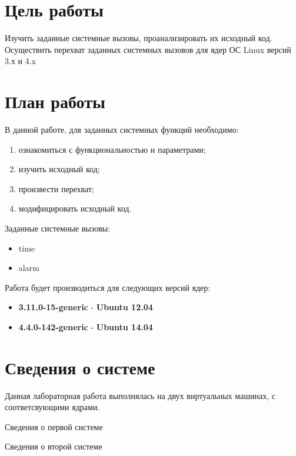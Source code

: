 




\section{Цель работы}
\par Изучить заданные системные вызовы, проанализировать их исходный код. Осуществить перехват заданных системных вызовов для ядер ОС Linux версий 3.х и 4.x

\section{План работы}
В данной работе, для заданных системных функций необходимо:
\begin{enumerate}
    \item ознакомиться с функциональностью и параметрами;
    \item изучить исходный код;
    \item произвести перехват;
    \item модифицировать исходный код.
\end{enumerate}

\par Заданные системные вызовы:
\begin{itemize}
    \item time
    \item alarm
\end{itemize}

\par Работа будет производиться для следующих версий ядер:
\begin{itemize}
\item \textbf{3.11.0-15-generic} - \textbf{Ubuntu 12.04}
\item \textbf{4.4.0-142-generic} - \textbf{Ubuntu 14.04}
\end{itemize}

\section{Сведения о системе}
\par Данная лабораторная работа выполнялась на двух виртуальных машинах, с соответсвующими ядрами.

\par Сведения о первой системе


\par Сведения о второй системе


